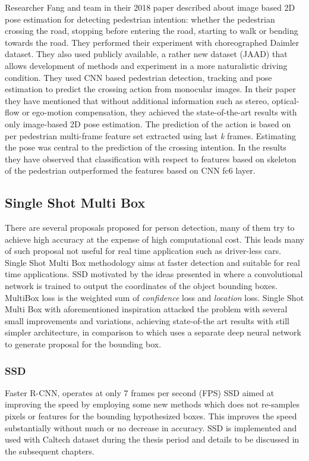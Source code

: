 \newpara
Researcher Fang and team in their 2018 paper \cite{fang2018pedestrian} described about image based 2D pose estimation for detecting pedestrian intention: whether the pedestrian crossing the road, stopping before entering the road, starting to walk or bending towards the road. They performed their experiment with choreographed Daimler dataset. They also used publicly available, a rather new dataset (JAAD) \cite{kotseruba2016joint} that allows development of methods and experiment in a more naturalistic driving condition. They used CNN based pedestrian detection, tracking and pose estimation to predict the crossing action from monocular images. In their paper they have mentioned that without additional information such as stereo, optical-flow or ego-motion compensation, they achieved the state-of-the-art results with only image-based 2D pose estimation. The prediction of the action is based on per pedestrian multi-frame feature set extracted using last \textit{k} frames. Estimating the pose was central to the prediction of the crossing intention. In the results they have observed that classification with respect to features based on  skeleton of the pedestrian outperformed the features based on CNN fc6 layer.

\subsection{Single Shot Multi Box}
There are several proposals proposed for person detection, many of them try to achieve high accuracy at the expense of high computational cost. This leads many of such proposal not useful for real time application such as driver-less cars. Single Shot Multi Box methodology aims at faster detection and suitable for real time applications.  
SSD motivated by the ideas presented in \cite{szegedy2014scalable} where a convolutional network is trained to output the coordinates of the object bounding boxes. MultiBox loss is the weighted sum of \textit{confidence} loss and \textit{location} loss. Single Shot Multi Box with aforementioned inspiration attacked the problem with several small improvements and variations, achieving state-of-the art results with still simpler architecture, in comparison to \cite{szegedy2014scalable} which uses a separate deep neural network to generate proposal for the bounding box.

\subsubsection{SSD}
Faster R-CNN, operates at only 7 frames per second (FPS) SSD aimed at improving the speed by employing some new methods which does not re-samples pixels or features for the bounding hypothesized boxes. This improves the speed substantially without much or no decrease in accuracy. SSD is implemented and used with Caltech dataset \cite{dollar2009pedestrian} during the thesis period and details to be discussed in the subsequent chapters.

